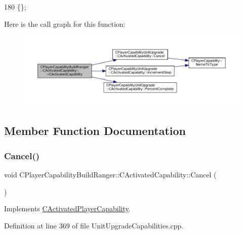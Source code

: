 \begin{DoxyCode}
180 \{\};
\end{DoxyCode}
Here is the call graph for this function\+:\nopagebreak
\begin{figure}[H]
\begin{center}
\leavevmode
\includegraphics[width=350pt]{classCPlayerCapabilityBuildRanger_1_1CActivatedCapability_afd5d1ba5ad2b35faa67e4574627d46e1_cgraph}
\end{center}
\end{figure}


\subsection{Member Function Documentation}
\hypertarget{classCPlayerCapabilityBuildRanger_1_1CActivatedCapability_a46a5240502d6a8de65d3d56bbda8bf91}{}\label{classCPlayerCapabilityBuildRanger_1_1CActivatedCapability_a46a5240502d6a8de65d3d56bbda8bf91} 
\subsubsection{\texorpdfstring{Cancel()}{Cancel()}}
{\footnotesize\ttfamily void C\+Player\+Capability\+Build\+Ranger\+::\+C\+Activated\+Capability\+::\+Cancel (\begin{DoxyParamCaption}{ }\end{DoxyParamCaption})\hspace{0.3cm}{\ttfamily [virtual]}}



Implements \hyperlink{classCActivatedPlayerCapability_a5cde83be468e262ad054d81e28684a81}{C\+Activated\+Player\+Capability}.



Definition at line 369 of file Unit\+Upgrade\+Capabilities.\+cpp.



